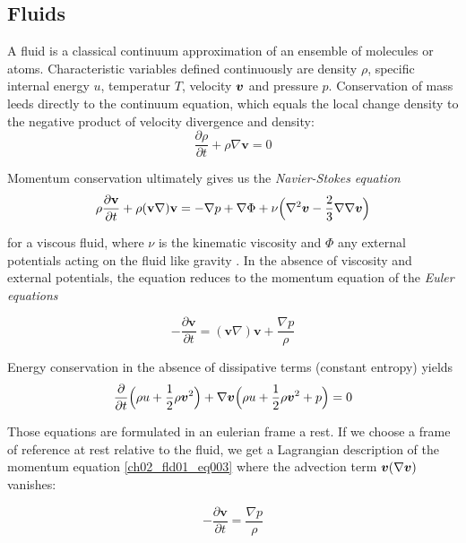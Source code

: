 \subsection{Fluids}
A fluid is a classical continuum approximation of an ensemble of molecules or atoms. Characteristic variables defined continuously are density $\rho$, specific internal energy $u$, temperatur $T$, velocity $\boldsymbol{v}$ and pressure $p$. Conservation of mass leeds directly to the continuum equation, which equals the local change density to the negative product of velocity divergence and density:
\begin{equation}
\label{ch02_fld01_eq001}
\frac{\partial \rho}{\partial t} + \rho \nabla \mathbf{v} = 0
\end{equation}

Momentum conservation ultimately gives us the \emph{Navier-Stokes equation} 
\begin{equation}
\label{ch02_fld01_eq002}
\rho \frac{\partial \mathbf{v}}{\partial t} + \rho ( \mathbf{v} \nabla ) \mathbf{v} = - \nabla p + \nabla \Phi + \nu \Big( \nabla^2 \boldsymbol{v} - \frac{2}{3} \nabla \nabla \boldsymbol{v} \Big)
\end{equation}

for a viscous fluid, where $\nu$ is the kinematic viscosity and $\Phi$ any external potentials acting on the fluid like gravity \citep{shore2007astrophysical}. In the absence of viscosity and external potentials, the equation reduces  to the momentum equation of the \emph{Euler equations}

\label{ch02_fld01_eq003}
\begin{equation}
- \frac{\partial \mathbf{v}}{\partial t} =  ( \mathbf{v} \nabla ) \mathbf{v} + \frac{\nabla p}{\rho}
\end{equation}

Energy conservation in the absence of dissipative terms (constant entropy) yields
\label{ch02_fld01_eq003a}
\begin{equation}
\frac{\partial}{\partial t} \Big( \rho u + \frac{1}{2}\rho \boldsymbol{v}^2 \Big) + \nabla \boldsymbol{v}\Big( \rho u + \frac{1}{2} \rho \boldsymbol{v}^2 + p \Big) = 0
\end{equation}

Those equations are formulated in an eulerian frame a rest. If we choose a frame of reference at rest relative to the fluid, we get a Lagrangian description of the momentum equation \ref{ch02_fld01_eq003} where the advection term $\boldsymbol{v} (\nabla \boldsymbol{v})$ vanishes:

\begin{equation}
\label{ch02_fld01_eq003b}
- \frac{\partial \mathbf{v}}{\partial t} = \frac{\nabla p}{\rho}
\end{equation}

